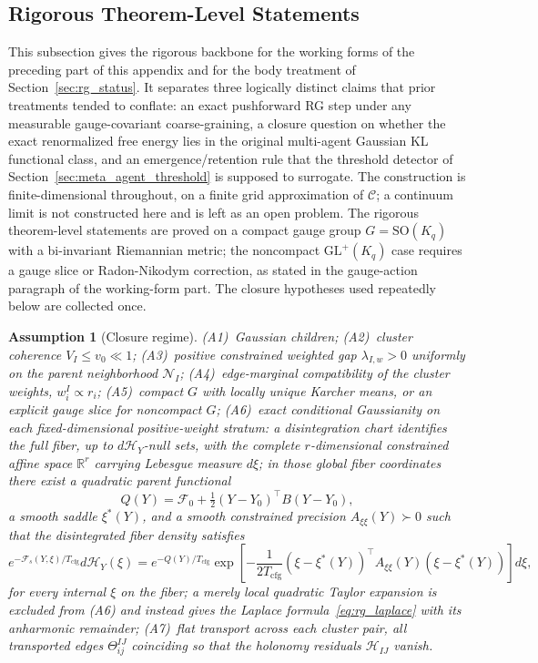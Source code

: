 \documentclass[11pt]{article}
\newtheorem{assumption}{Assumption}
\begin{document}
\subsection{Rigorous Theorem-Level Statements}
\label{app:rigorous_rg}

This subsection gives the rigorous backbone for the working forms of the preceding part of this appendix and for the body treatment of Section~\ref{sec:rg_status}. It separates three logically distinct claims that prior treatments tended to conflate: an exact pushforward RG step under any measurable gauge-covariant coarse-graining, a closure question on whether the exact renormalized free energy lies in the original multi-agent Gaussian KL functional class, and an emergence/retention rule that the threshold detector of Section~\ref{sec:meta_agent_threshold} is supposed to surrogate. The construction is finite-dimensional throughout, on a finite grid approximation of $\mathcal{C}$; a continuum limit is not constructed here and is left as an open problem. The rigorous theorem-level statements are proved on a compact gauge group $G = \mathrm{SO}(K_q)$ with a bi-invariant Riemannian metric; the noncompact $\mathrm{GL}^+(K_q)$ case requires a gauge slice or Radon-Nikodym correction, as stated in the gauge-action paragraph of the working-form part. The closure hypotheses used repeatedly below are collected once.

\begin{assumption}[Closure regime]
\label{ass:closure_regime}
(A1)~Gaussian children; (A2)~cluster coherence $V_I \le v_0 \ll 1$; (A3)~positive constrained weighted gap $\lambda_{I,w} > 0$ uniformly on the parent neighborhood $\mathcal{N}_I$; (A4)~edge-marginal compatibility of the cluster weights, $w_i^I \propto r_i$; (A5)~compact $G$ with locally unique Karcher means, or an explicit gauge slice for noncompact $G$; (A6)~exact conditional Gaussianity on each fixed-dimensional positive-weight stratum: a disintegration chart identifies the full fiber, up to $d\mathcal{H}_Y$-null sets, with the complete $r$-dimensional constrained affine space $\mathbb{R}^r$ carrying Lebesgue measure $d\xi$; in those global fiber coordinates there exist a quadratic parent functional
\begin{equation}
Q(Y)=\mathcal{F}_0+\tfrac12(Y-Y_0)^\top B(Y-Y_0),
\end{equation}
a smooth saddle $\xi^*(Y)$, and a smooth constrained precision $A_{\xi\xi}(Y)\succ0$ such that the disintegrated fiber density satisfies
\begin{equation}
e^{-\mathcal{F}_s(Y,\xi)/T_{\mathrm{cfg}}}d\mathcal{H}_Y(\xi)
=e^{-Q(Y)/T_{\mathrm{cfg}}}\exp\left[-\frac{1}{2T_{\mathrm{cfg}}}(\xi-\xi^*(Y))^\top A_{\xi\xi}(Y)(\xi-\xi^*(Y))\right]d\xi,
\end{equation}
for every internal $\xi$ on the fiber; a merely local quadratic Taylor expansion is excluded from (A6) and instead gives the Laplace formula~\eqref{eq:rg_laplace} with its anharmonic remainder; (A7)~flat transport across each cluster pair, all transported edges $\Theta_{ij}^{IJ}$ coinciding so that the holonomy residuals $\mathcal{H}_{IJ}$ vanish.
\end{assumption}
\end{document}
